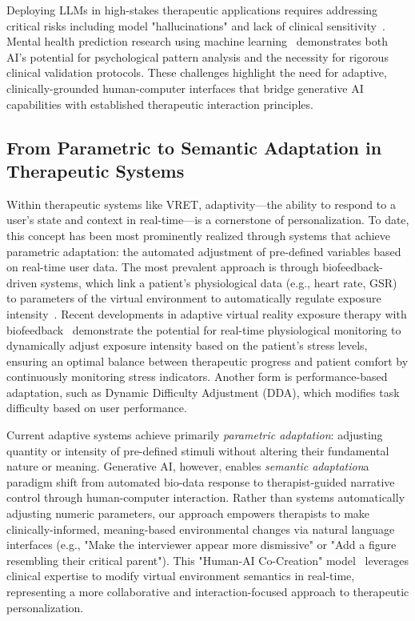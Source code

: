 \documentclass[]{interact}
\begin{document}
Deploying LLMs in high-stakes therapeutic applications requires addressing critical risks including model "hallucinations" and lack of clinical sensitivity~\cite{stade2024large}. Mental health prediction research using machine learning~\cite{kamoji2024mental} demonstrates both AI's potential for psychological pattern analysis and the necessity for rigorous clinical validation protocols. These challenges highlight the need for adaptive, clinically-grounded human-computer interfaces that bridge generative AI capabilities with established therapeutic interaction principles.

\subsection{From Parametric to Semantic Adaptation in Therapeutic Systems}

Within therapeutic systems like VRET, adaptivity—the ability to respond to a user's state and context in real-time—is a cornerstone of personalization. To date, this concept has been most prominently realized through systems that achieve parametric adaptation: the automated adjustment of pre-defined variables based on real-time user data. The most prevalent approach is through biofeedback-driven systems, which link a patient's physiological data (e.g., heart rate, GSR) to parameters of the virtual environment to automatically regulate exposure intensity~\cite{zelis2025adaptive, luddecke2022virtual}. Recent developments in adaptive virtual reality exposure therapy with biofeedback~\cite{zelis2025adaptive} demonstrate the potential for real-time physiological monitoring to dynamically adjust exposure intensity based on the patient's stress levels, ensuring an optimal balance between therapeutic progress and patient comfort by continuously monitoring stress indicators. Another form is performance-based adaptation, such as Dynamic Difficulty Adjustment (DDA), which modifies task difficulty based on user performance.

Current adaptive systems achieve primarily \emph{parametric adaptation}: adjusting quantity or intensity of pre-defined stimuli without altering their fundamental nature or meaning. Generative AI, however, enables \emph{semantic adaptation}\textendash a paradigm shift from automated bio-data response to therapist-guided narrative control through human-computer interaction. Rather than systems automatically adjusting numeric parameters, our approach empowers therapists to make clinically-informed, meaning-based environmental changes via natural language interfaces (e.g., "Make the interviewer appear more dismissive" or "Add a figure resembling their critical parent"). This "Human-AI Co-Creation" model~\cite{mosqueira2022human} leverages clinical expertise to modify virtual environment semantics in real-time, representing a more collaborative and interaction-focused approach to therapeutic personalization.
\end{document}
